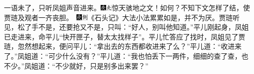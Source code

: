 {一语未了，只听凤姐声音进来。{\includegraphics[width=3mm]{../Images/00004}\includegraphics[width=3mm]{../Images/00012}\footnotesize \kaishu 惊天骇地之文！如何？不知下文怎样了结，使贾琏及观者一齐丧胆。　{\includegraphics[width=3mm]{../Images/00004}\includegraphics[width=3mm]{../Images/00011}\footnotesize \kaishu 《石头记》大法小法累累如是，并不为厌。}}贾琏听见，松了手不是，还要抢又不是，只叫：“好人，别叫他知道。”平儿刚起身，凤姐已走进来，命平儿“快开匣子，替太太找样子”。平儿忙答应了找时，凤姐见了贾琏，忽然想起来，便问平儿：“拿出去的东西都收进来了么？”平儿道：“收进来了。”凤姐道：“可少什么没有？”平儿道：“我也怕丢下一两件，细细的查了查，也不少。”凤姐道：“不少就好，只是别多出来罢？”{{
}}}

